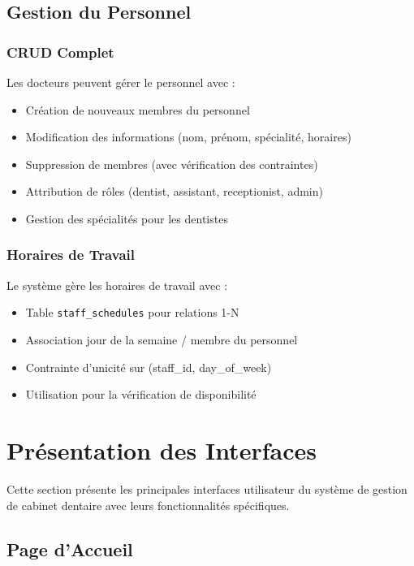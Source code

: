 \documentclass[12pt,a4paper]{report}
\begin{document}
\subsection{Gestion du Personnel}

\subsubsection{CRUD Complet}

Les docteurs peuvent gérer le personnel avec :
\begin{itemize}
    \item Création de nouveaux membres du personnel
    \item Modification des informations (nom, prénom, spécialité, horaires)
    \item Suppression de membres (avec vérification des contraintes)
    \item Attribution de rôles (dentist, assistant, receptionist, admin)
    \item Gestion des spécialités pour les dentistes
\end{itemize}

\subsubsection{Horaires de Travail}

Le système gère les horaires de travail avec :
\begin{itemize}
    \item Table \texttt{staff\_schedules} pour relations 1-N
    \item Association jour de la semaine / membre du personnel
    \item Contrainte d'unicité sur (staff\_id, day\_of\_week)
    \item Utilisation pour la vérification de disponibilité
\end{itemize}

\section{Présentation des Interfaces}

Cette section présente les principales interfaces utilisateur du système de gestion de cabinet dentaire avec leurs fonctionnalités spécifiques.

\subsection{Page d'Accueil}
\end{document}
